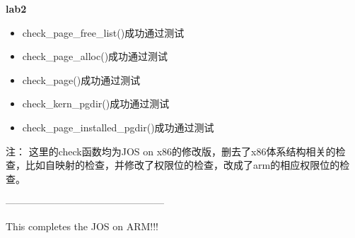 \documentclass[11pt,a4paper]{article}
\begin{document}
\begin{CJK}{UTF8}{gkai}
		\textbf{lab2}
		
		\begin{itemize}
			\item check\_page\_free\_list()成功通过测试
			\item 	check\_page\_alloc()成功通过测试
			\item check\_page()成功通过测试
			\item check\_kern\_pgdir()成功通过测试
			\item check\_page\_installed\_pgdir()成功通过测试
		\end{itemize}
		
		注： 这里的check函数均为JOS on x86的修改版，删去了x86体系结构相关的检查，比如自映射的检查，并修改了权限位的检查，改成了arm的相应权限位的检查。

------------------------------------------------

This completes the JOS  on ARM!!!
\end{CJK}
\end{document}
